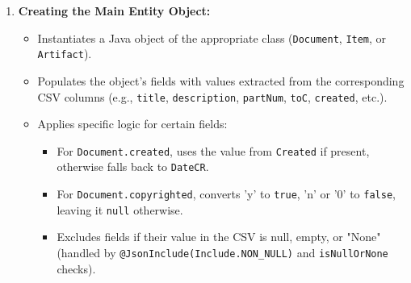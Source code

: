 \begin{enumerate}
    \item \textbf{Creating the Main Entity Object:}
        \begin{itemize}
            \item Instantiates a Java object of the appropriate class (\texttt{Document}, \texttt{Item}, or \texttt{Artifact}).
            \item Populates the object's fields with values extracted from the corresponding CSV columns (e.g., \texttt{title}, \texttt{description}, \texttt{partNum}, \texttt{toC}, \texttt{created}, etc.).
            \item Applies specific logic for certain fields:
                \begin{itemize}
                    \item For \texttt{Document.created}, uses the value from \texttt{Created} if present, otherwise falls back to \texttt{DateCR}.
                    \item For \texttt{Document.copyrighted}, converts 'y' to \texttt{true}, 'n' or '0' to \texttt{false}, leaving it \texttt{null} otherwise.
                    \item Excludes fields if their value in the CSV is null, empty, or "None" (handled by \texttt{@JsonInclude(Include.NON\_NULL)} and \texttt{isNullOrNone} checks).
                \end{itemize}
        \end{itemize}


\end{enumerate}
